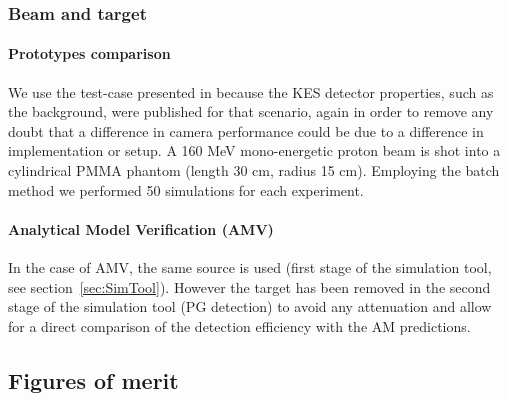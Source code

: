 \documentclass[a4paper,english,12pt]{article}
\begin{document}
\subsubsection{Beam and target}

\paragraph{Prototypes comparison}

We use the test-case presented in \cite{Perali2014} because the KES detector properties, such as the background, were published for that scenario, again in order to remove any doubt that a difference in camera performance could be due to a difference in implementation or setup. A 160 MeV mono-energetic proton beam is shot into a cylindrical PMMA phantom (length 30 cm, radius 15 cm). Employing the batch method we performed 50 simulations for each experiment.

\paragraph{Analytical Model Verification (AMV)}

In the case of AMV, the same source is used (first stage of the simulation tool, see section~\ref{sec:SimTool}). However the target has been removed in the second stage of the simulation tool (PG detection) to avoid any attenuation and allow for a direct comparison of the detection efficiency with the AM predictions.


\subsection{Figures of merit}\label{figmerit}

\end{document}

